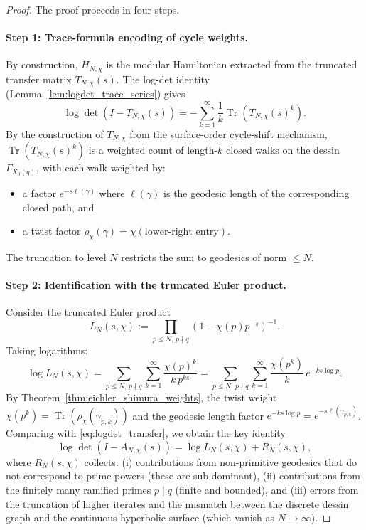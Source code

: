 \documentclass[11pt,oneside]{amsbook}
\numberwithin{equation}{section}
\theoremstyle{plain}
\theoremstyle{definition}
\theoremstyle{remark}
\DeclareMathOperator{\Tr}{\mathrm{Tr}}
\begin{document}
\begin{proof}
The proof proceeds in four steps.

\paragraph{Step 1: Trace-formula encoding of cycle weights.}
By construction, $H_{N,\chi}$ is the modular Hamiltonian extracted from the truncated transfer matrix $T_{N,\chi}(s)$.
The log-det identity (Lemma~\ref{lem:logdet_trace_series}) gives
\begin{equation}
\label{eq:logdet_transfer}
\log\det(I-T_{N,\chi}(s)) = -\sum_{k=1}^{\infty}\frac{1}{k}\Tr(T_{N,\chi}(s)^k).
\end{equation}
By the construction of $T_{N,\chi}$ from the surface-order cycle-shift mechanism, $\Tr(T_{N,\chi}(s)^k)$ is a weighted count of length-$k$ closed walks on the dessin $\Gamma_{X_0(q)}$, with each walk weighted by:
\begin{itemize}
\item a factor $e^{-s\ell(\gamma)}$ where $\ell(\gamma)$ is the geodesic length of the corresponding closed path, and
\item a twist factor $\rho_\chi(\gamma)=\chi(\text{lower-right entry})$.
\end{itemize}
The truncation to level $N$ restricts the sum to geodesics of norm $\le N$.

\paragraph{Step 2: Identification with the truncated Euler product.}
Consider the truncated Euler product
\[
L_N(s,\chi):=\prod_{p\le N,\, p\nmid q}(1-\chi(p)p^{-s})^{-1}.
\]
Taking logarithms:
\[
\log L_N(s,\chi) = \sum_{p\le N,\,p\nmid q}\sum_{k=1}^\infty \frac{\chi(p)^k}{k\,p^{ks}}
= \sum_{p\le N,\,p\nmid q}\sum_{k=1}^\infty \frac{\chi(p^k)}{k}\,e^{-ks\log p}.
\]
By Theorem~\ref{thm:eichler_shimura_weights}, the twist weight $\chi(p^k)=\Tr(\rho_\chi(\gamma_{p,k}))$ and the geodesic length factor $e^{-ks\log p}=e^{-s\ell(\gamma_{p,k})}$.
Comparing with \eqref{eq:logdet_transfer}, we obtain the key identity
\begin{equation}
\label{eq:key_identity_logdet_euler}
\log\det(I-A_{N,\chi}(s))
=
\log L_N(s,\chi) + R_N(s,\chi),
\end{equation}
where $R_N(s,\chi)$ collects:
(i) contributions from non-primitive geodesics that do not correspond to prime powers (these are sub-dominant),
(ii) contributions from the finitely many ramified primes $p\mid q$ (finite and bounded), and
(iii) errors from the truncation of higher iterates and the mismatch between the discrete dessin graph and the continuous hyperbolic surface (which vanish as $N\to\infty$).


\end{proof}
\end{document}
